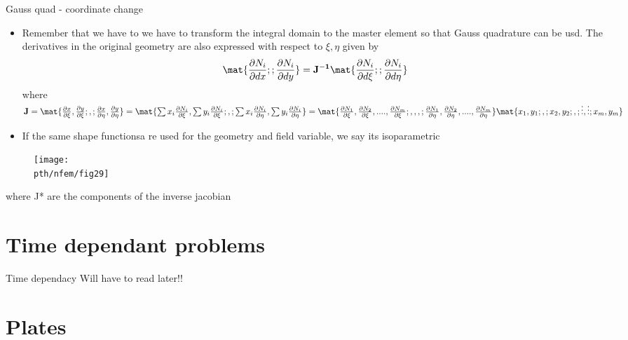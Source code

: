 	
	\begin{frame}{Gauss quad - coordinate change}
		\begin{itemize}
			\item Remember that we have to we have to transform the integral domain to the master element so that Gauss quadrature can be usd. The derivatives in the original geometry are also expressed with respect to $\xi,\eta$ given by
			\begin{equation}
			\mat{\frac{\partial N_i}{\partial dx}; ;\frac{\partial N_i}{\partial dy} } = \ve{J^{-1}} \mat{\frac{\partial N_i}{\partial d\xi}; ;\frac{\partial N_i}{\partial d\eta} } 
			\end{equation}
			where $\ve{J} = \mat{\frac{\partial x}{\partial \xi}, \frac{\partial y}{\partial \xi}; , ; \frac{\partial x}{\partial \eta}, \frac{\partial y}{\partial \eta}} =
			\mat {\sum x_i \frac{\partial N_i}{\partial \xi}, \sum y_i \frac{\partial N_i}{\partial \xi} ; , ; 
			\sum x_i \frac{\partial N_i}{\partial \eta}, \sum y_i \frac{\partial N_i}{\partial \eta}} = \mat{\frac{\partial N_1}{\partial \xi}, \frac{\partial N_2}{\partial \xi}, .... ,\frac{\partial N_m}{\partial \xi} ; , , ,;
			\frac{\partial N_1}{\partial \eta}, \frac{\partial N_2}{\partial \eta}, ...., \frac{\partial N_m}{\partial \eta} }
	 		\mat{x_1, y_1; , ; x_2, y_2; , ; \vdots, \vdots; x_m,y_m}$ 
	 		\item If the same shape functionsa re used for the geometry and field variable, we say its isoparametric
		\end{itemize}
	\end{frame}


	\begin{frame}
		\begin{figure}
			\centering
			\texttt{[image: \\pth/nfem/fig29]} 		
		\end{figure} 
	where J* are the components of the inverse jacobian
	\end{frame}


	\section{Time dependant problems}
	
	\begin{frame}{Time dependacy}
		Will have to read later!!
	\end{frame}



\section{Plates}

